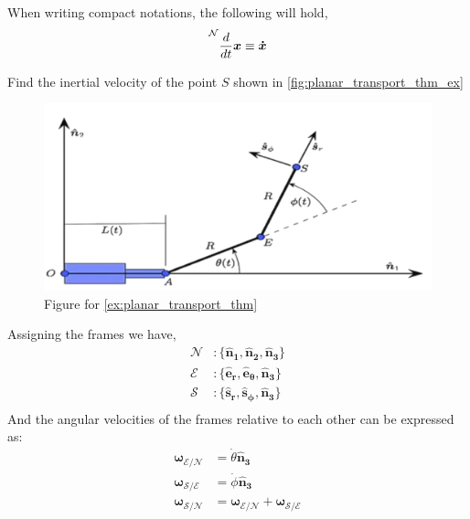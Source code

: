 \begin{note}
	When writing compact notations, the following will hold,
	\[
		\prescript{\mathcal{N}}{}{\frac{d}{dt}\bm{x} } \equiv \bm{\dot{x} }
	\]
\end{note}

\begin{example}
	\label{ex:planar_transport_thm}
	Find the inertial velocity of the point \(S\) shown in \autoref{fig:planar_transport_thm_ex}
	\begin{figure}[H]
		\centering
		\includegraphics[width=\linewidth]{figures/dynamics/planar_transport_thm_ex.png}
		\caption{Figure for \autoref{ex:planar_transport_thm}}
		\label{fig:planar_transport_thm_ex}
	\end{figure}
	Assigning the frames we have,
	\[
		\begin{aligned}
			\mathcal{N} & \colon  \{ \bm{{\hat{n}_{1}}} , \bm{{\hat{n}_{2}}} , \bm{{\hat{n}_{3}}}  \}       \\
			\mathcal{E} & \colon  \{ \bm{{\hat{e}_{r}}} , \bm{{\hat{e}_{\theta }}} , \bm{{\hat{n}_{3}}}  \} \\
			\mathcal{S} & \colon  \{ \bm{{\hat{s}_{r}}} , \bm{{\hat{s}_{\phi }}} , \bm{{\hat{n}_{3}}}  \}   \\
		\end{aligned}
	\]
	And the angular velocities of the frames relative to each other can be expressed as:
	\[
		\begin{aligned}
			\bm{\omega _{\mathcal{E} / \mathcal{N} }} & = \dot{ \theta} \bm{{\hat{n}_{3}}}                                                    \\
			\bm{\omega _{\mathcal{S} / \mathcal{E} }} & = \dot{ \phi} \bm{{\hat{n}_{3}}}                                                      \\
			\bm{\omega _{\mathcal{S} / \mathcal{N} }} & = \bm{\omega _{\mathcal{E} / \mathcal{N} }}+\bm{\omega _{\mathcal{S} / \mathcal{E} }} \\

\end{aligned}\]
\end{example}
